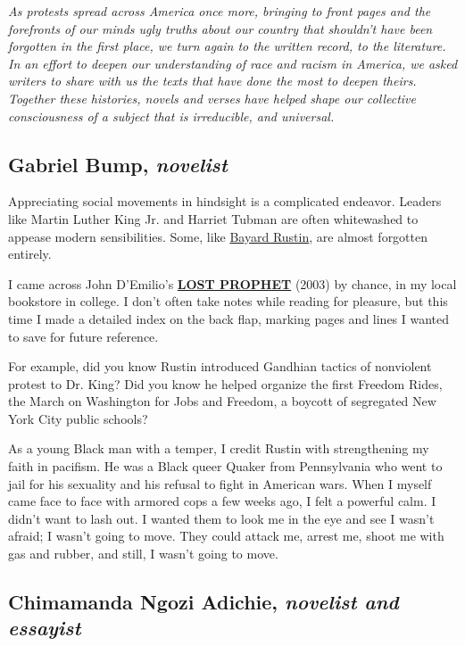 \emph{As protests spread across America once more, bringing to front
pages and the forefronts of our minds ugly truths about our country that
shouldn't have been forgotten in the first place, we turn again to the
written record, to the literature. In an effort to deepen our
understanding of race and racism in America, we asked writers to share
with us the texts that have done the most to deepen theirs. Together
these histories, novels and verses have helped shape our collective
consciousness of a subject that is irreducible, and universal.}

\hypertarget{gabriel-bump-novelist}{%
\subsection{\texorpdfstring{Gabriel Bump,
\emph{novelist}}{Gabriel Bump, novelist}}\label{gabriel-bump-novelist}}

Appreciating social movements in hindsight is a complicated endeavor.
Leaders like Martin Luther King Jr. and Harriet Tubman are often
whitewashed to appease modern sensibilities. Some, like
\href{https://www.nytimes.com/1987/08/25/obituaries/bayard-rustin-is-dead-at-75-pacifist-and-a-rights-activist.html}{Bayard
Rustin}, are almost forgotten entirely.

I came across John D'Emilio's
\textbf{\href{https://www.nytimes.com/2003/11/09/books/the-organizer.html}{LOST
PROPHET}} (2003) by chance, in my local bookstore in college. I don't
often take notes while reading for pleasure, but this time I made a
detailed index on the back flap, marking pages and lines I wanted to
save for future reference.

For example, did you know Rustin introduced Gandhian tactics of
nonviolent protest to Dr. King? Did you know he helped organize the
first Freedom Rides, the March on Washington for Jobs and Freedom, a
boycott of segregated New York City public schools?

As a young Black man with a temper, I credit Rustin with strengthening
my faith in pacifism. He was a Black queer Quaker from Pennsylvania who
went to jail for his sexuality and his refusal to fight in American
wars. When I myself came face to face with armored cops a few weeks ago,
I felt a powerful calm. I didn't want to lash out. I wanted them to look
me in the eye and see I wasn't afraid; I wasn't going to move. They
could attack me, arrest me, shoot me with gas and rubber, and still, I
wasn't going to move.

\hypertarget{chimamanda-ngozi-adichie-novelist-and-essayist}{%
\subsection{\texorpdfstring{Chimamanda Ngozi Adichie, \emph{novelist and
essayist}}{Chimamanda Ngozi Adichie, novelist and essayist}}\label{chimamanda-ngozi-adichie-novelist-and-essayist}}

